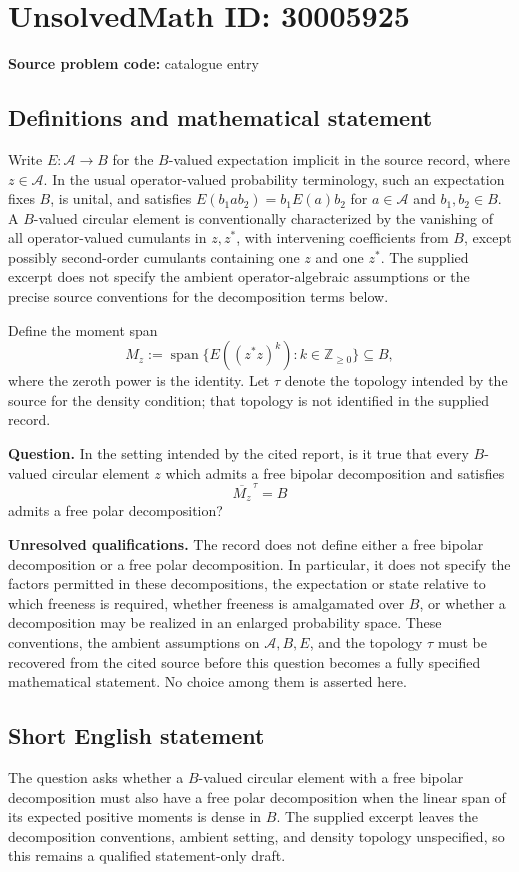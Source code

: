 \documentclass[11pt]{article}
\begin{document}
\section*{UnsolvedMath ID: 30005925}
\textbf{Source problem code:} catalogue entry
\subsection{Definitions and mathematical statement}
Write \(E\colon\mathcal A\to B\) for the \(B\)-valued expectation implicit in the source record, where \(z\in\mathcal A\). In the usual operator-valued probability terminology, such an expectation fixes \(B\), is unital, and satisfies \(E(b_1ab_2)=b_1E(a)b_2\) for \(a\in\mathcal A\) and \(b_1,b_2\in B\). A \(B\)-valued circular element is conventionally characterized by the vanishing of all operator-valued cumulants in \(z,z^*\), with intervening coefficients from \(B\), except possibly second-order cumulants containing one \(z\) and one \(z^*\). The supplied excerpt does not specify the ambient operator-algebraic assumptions or the precise source conventions for the decomposition terms below.

Define the moment span
\[
M_z:=\operatorname{span}\bigl\{E((z^*z)^k):k\in\mathbb Z_{\geq0}\bigr\}\subseteq B,
\]
where the zeroth power is the identity. Let \(\tau\) denote the topology intended by the source for the density condition; that topology is not identified in the supplied record.

\textbf{Question.} In the setting intended by the cited report, is it true that every \(B\)-valued circular element \(z\) which admits a free bipolar decomposition and satisfies
\[
\overline{M_z}^{\,\tau}=B
\]
admits a free polar decomposition?

\textbf{Unresolved qualifications.} The record does not define either a free bipolar decomposition or a free polar decomposition. In particular, it does not specify the factors permitted in these decompositions, the expectation or state relative to which freeness is required, whether freeness is amalgamated over \(B\), or whether a decomposition may be realized in an enlarged probability space. These conventions, the ambient assumptions on \(\mathcal A,B,E\), and the topology \(\tau\) must be recovered from the cited source before this question becomes a fully specified mathematical statement. No choice among them is asserted here.
\subsection{Short English statement}
The question asks whether a \(B\)-valued circular element with a free bipolar decomposition must also have a free polar decomposition when the linear span of its expected positive moments is dense in \(B\). The supplied excerpt leaves the decomposition conventions, ambient setting, and density topology unspecified, so this remains a qualified statement-only draft.
\end{document}
